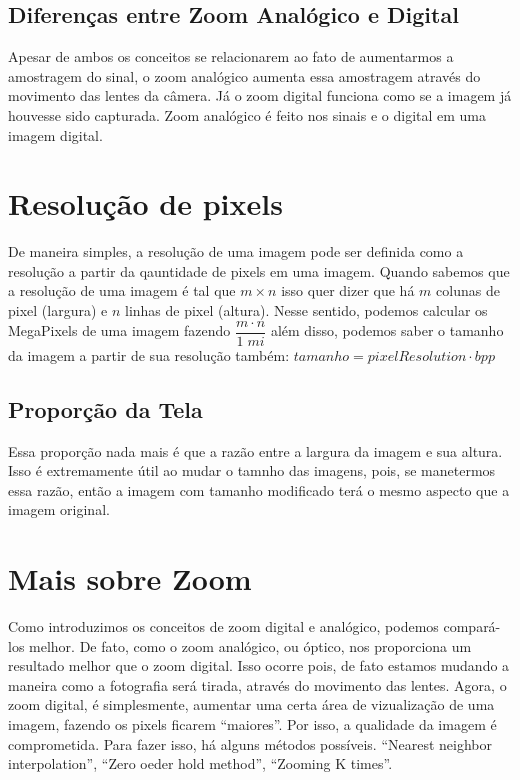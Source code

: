 \documentclass[a4paper, 12pt]{article}
\begin{document}
\subsection{Diferenças entre Zoom Analógico e Digital}
Apesar de ambos os conceitos se relacionarem ao fato de aumentarmos a amostragem do sinal, o zoom analógico aumenta essa amostragem através do movimento das lentes 
da câmera. Já o zoom digital funciona como se a imagem já houvesse sido capturada. Zoom analógico é feito nos sinais e o digital em uma imagem digital.

\section{Resolução de pixels}
De maneira simples, a resolução de uma imagem pode ser definida como a resolução a partir da qauntidade de pixels em uma imagem. Quando sabemos que a resolução de 
uma imagem é tal que $m \times n$ isso quer dizer que há $m$ colunas de pixel (largura) e $n$ linhas de pixel (altura). Nesse sentido, podemos calcular os 
MegaPixels de uma imagem fazendo $\dfrac{m \cdot n}{1\; mi}$ além disso, podemos saber o tamanho da imagem a partir de sua resolução também: 
$tamanho = pixelResolution \cdot bpp$ 

\subsection{Proporção da Tela}
Essa proporção nada mais é que a razão entre a largura da imagem e sua altura. Isso é extremamente útil ao mudar o tamnho das imagens, pois, 
se manetermos essa razão, então a imagem com tamanho modificado terá o mesmo aspecto que a imagem original.

\section{Mais sobre Zoom}
Como introduzimos os conceitos de zoom digital e analógico, podemos compará-los melhor. De fato, como o zoom analógico, ou óptico, nos proporciona 
um resultado melhor que o zoom digital. Isso ocorre pois, de fato estamos mudando a maneira como a fotografia será tirada, através do movimento das lentes.
Agora, o zoom digital, é simplesmente, aumentar uma certa área de vizualização de uma imagem, fazendo os pixels ficarem ``maiores''. Por isso, a qualidade da 
imagem é comprometida. Para fazer isso, há alguns métodos possíveis. ``Nearest neighbor interpolation'', ``Zero oeder hold method'', ``Zooming K times''.
\\
\end{document}
